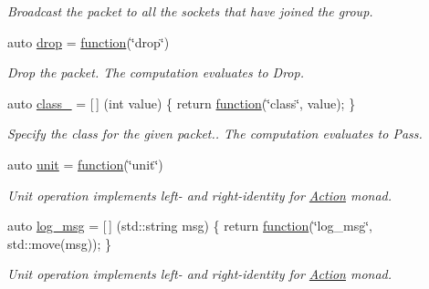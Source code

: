 \begin{DoxyCompactItemize}
\begin{DoxyCompactList}\small\item\em Broadcast the packet to all the sockets that have joined the group. \end{DoxyCompactList}\item 
auto \hyperlink{namespacepfq_1_1lang_1_1anonymous__namespace_02default_8hpp_03_a0d715988e000ac6284a1615091eb4067}{drop} = \hyperlink{namespacepfq_1_1lang_a1a4638059d700ae08d0ca63886ff2bb3}{function}(\char`\"{}drop\char`\"{})
\begin{DoxyCompactList}\small\item\em Drop the packet. The computation evaluates to {\ttfamily Drop}. \end{DoxyCompactList}\item 
auto \hyperlink{namespacepfq_1_1lang_1_1anonymous__namespace_02default_8hpp_03_a73e1198ca0a5077b083d7900cff17505}{class\+\_\+} = \mbox{[}$\,$\mbox{]} (int value) \{ return \hyperlink{namespacepfq_1_1lang_a1a4638059d700ae08d0ca63886ff2bb3}{function}(\char`\"{}class\char`\"{}, value); \}
\begin{DoxyCompactList}\small\item\em Specify the class for the given packet.. The computation evaluates to {\ttfamily Pass}. \end{DoxyCompactList}\item 
auto \hyperlink{namespacepfq_1_1lang_1_1anonymous__namespace_02default_8hpp_03_a85f9b2d401cbb1d135679160de0e97de}{unit} = \hyperlink{namespacepfq_1_1lang_a1a4638059d700ae08d0ca63886ff2bb3}{function}(\char`\"{}unit\char`\"{})
\begin{DoxyCompactList}\small\item\em Unit operation implements left-\/ and right-\/identity for \hyperlink{structpfq_1_1lang_1_1Action}{Action} monad. \end{DoxyCompactList}\item 
auto \hyperlink{namespacepfq_1_1lang_1_1anonymous__namespace_02default_8hpp_03_a82e76226844f043aac9a2dd01615c9bb}{log\+\_\+msg} = \mbox{[}$\,$\mbox{]} (std\+::string msg) \{ return \hyperlink{namespacepfq_1_1lang_a1a4638059d700ae08d0ca63886ff2bb3}{function}(\char`\"{}log\+\_\+msg\char`\"{}, std\+::move(msg)); \}
\begin{DoxyCompactList}\small\item\em Unit operation implements left-\/ and right-\/identity for \hyperlink{structpfq_1_1lang_1_1Action}{Action} monad. \end{DoxyCompactList}\item 

\end{DoxyCompactItemize}

